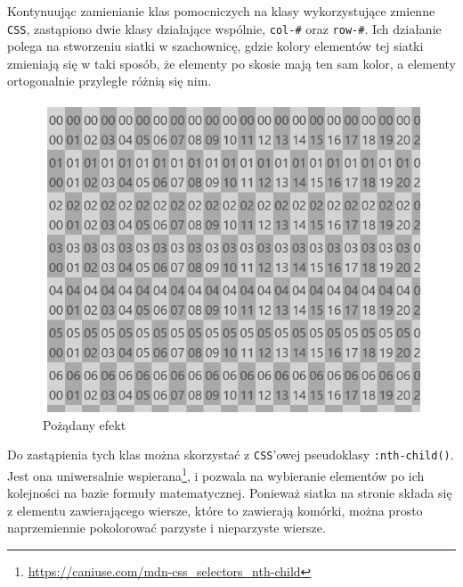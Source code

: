 \documentclass[licencjacka]{pracadypl}
\begin{document}
Kontynuując zamienianie klas pomocniczych na klasy wykorzystujące zmienne \texttt{CSS}, zastąpiono dwie klasy działające wspólnie, \texttt{col-\#} oraz \texttt{row-\#}. Ich działanie polega na stworzeniu siatki w szachownicę, gdzie kolory elementów tej siatki zmieniają się w taki sposób, że elementy po skosie mają ten sam kolor, a elementy ortogonalnie przyległe różnią się nim.

\begin{figure}[H]
  \centering
  \includegraphics[width=\linewidth/\real{1.5}]{images/ui-grid-darken.png}
  \caption{Pożądany efekt}
  \label{fig:ui-grid-darken}
\end{figure}

Do zastąpienia tych klas można skorzystać z \texttt{CSS}'owej pseudoklasy \texttt{:nth-child()}. Jest ona uniwersalnie wspierana\footnote{\url{https://caniuse.com/mdn-css_selectors_nth-child}}, i pozwala na wybieranie elementów po ich kolejności na bazie formuły matematycznej. Ponieważ siatka na stronie składa się z elementu zawierającego wiersze, które to zawierają komórki, można prosto naprzemiennie pokolorować parzyste i nieparzyste wiersze.
\end{document}
